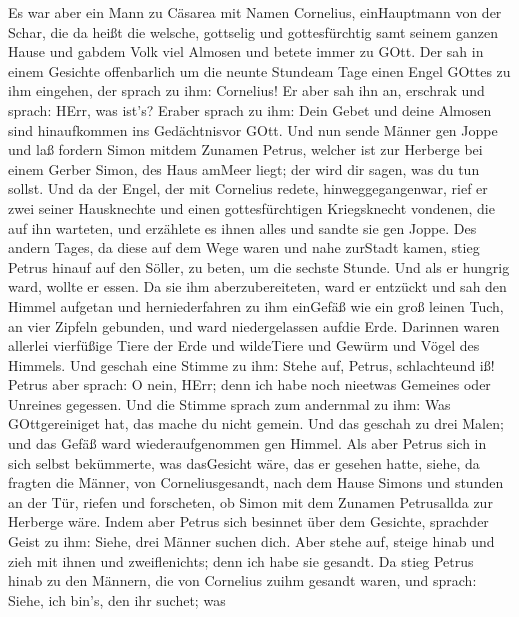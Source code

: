  Es war aber ein Mann zu Cäsarea mit Namen Cornelius,
einHauptmann von der Schar, die da heißt die welsche, 
gottselig und gottesfürchtig samt seinem ganzen Hause und gabdem Volk
viel Almosen und betete immer zu GOtt.  Der sah in einem
Gesichte offenbarlich um die neunte Stundeam Tage einen Engel GOttes zu
ihm eingehen, der sprach zu ihm: Cornelius!  Er aber sah ihn
an, erschrak und sprach: HErr, was ist's? Eraber sprach zu ihm: Dein
Gebet und deine Almosen sind hinaufkommen ins Gedächtnisvor GOtt.
 Und nun sende Männer gen Joppe und laß fordern Simon mitdem
Zunamen Petrus,  welcher ist zur Herberge bei einem Gerber
Simon, des Haus amMeer liegt; der wird dir sagen, was du tun sollst.
 Und da der Engel, der mit Cornelius redete,
hinweggegangenwar, rief er zwei seiner Hausknechte und einen
gottesfürchtigen Kriegsknecht vondenen, die auf ihn warteten,
 und erzählete es ihnen alles und sandte sie gen Joppe.
 Des andern Tages, da diese auf dem Wege waren und nahe
zurStadt kamen, stieg Petrus hinauf auf den Söller, zu beten, um die
sechste Stunde.  Und als er hungrig ward, wollte er essen.
Da sie ihm aberzubereiteten, ward er entzückt  und sah den
Himmel aufgetan und herniederfahren zu ihm einGefäß wie ein groß leinen
Tuch, an vier Zipfeln gebunden, und ward niedergelassen aufdie Erde.
 Darinnen waren allerlei vierfüßige Tiere der Erde und
wildeTiere und Gewürm und Vögel des Himmels.  Und geschah
eine Stimme zu ihm: Stehe auf, Petrus, schlachteund iß! 
Petrus aber sprach: O nein, HErr; denn ich habe noch nieetwas Gemeines
oder Unreines gegessen.  Und die Stimme sprach zum
andernmal zu ihm: Was GOttgereiniget hat, das mache du nicht gemein.
 Und das geschah zu drei Malen; und das Gefäß ward
wiederaufgenommen gen Himmel.  Als aber Petrus sich in sich
selbst bekümmerte, was dasGesicht wäre, das er gesehen hatte, siehe, da
fragten die Männer, von Corneliusgesandt, nach dem Hause Simons und
stunden an der Tür,  riefen und forscheten, ob Simon mit
dem Zunamen Petrusallda zur Herberge wäre.  Indem aber
Petrus sich besinnet über dem Gesichte, sprachder Geist zu ihm: Siehe,
drei Männer suchen dich.  Aber stehe auf, steige hinab und
zieh mit ihnen und zweiflenichts; denn ich habe sie gesandt.
 Da stieg Petrus hinab zu den Männern, die von Cornelius
zuihm gesandt waren, und sprach: Siehe, ich bin's, den ihr suchet; was
